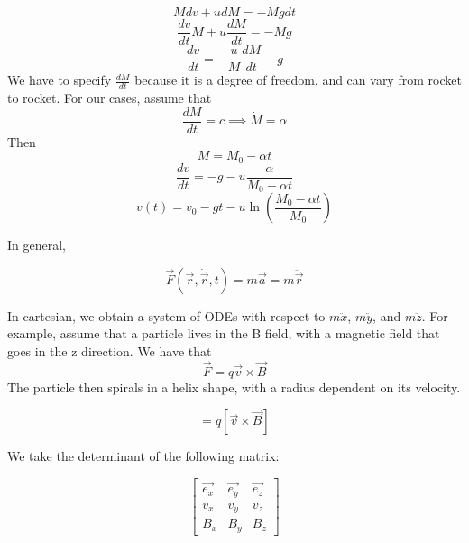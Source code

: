\documentclass{article}
\newtheorem{one minute paper}[theorem]{One Minute Paper}
\begin{document}
\begin{equation}
    Mdv + udM = -Mgdt
\end{equation}
\begin{equation}
    \frac{dv}{dt}M +  u \frac{dM}{dt} = -Mg
\end{equation}
\begin{equation}
    \frac{dv}{dt} = -\frac{u}{M}\frac{dM}{dt} - g
\end{equation}
We have to specify $\frac{dM}{dt}$ because it is a degree of freedom, and can vary from rocket to rocket. For our cases, assume that
\begin{equation}
    \frac{dM}{dt} = c \implies \dot{M} = \alpha
\end{equation}
Then 
\begin{equation}
    M = M_0 - \alpha t
\end{equation}
\begin{equation}
    \frac{dv}{dt} = -g - u\frac{\alpha}{M_0 - \alpha t}
\end{equation}
\begin{equation}
    v(t) = v_0 - gt - u\ln\left(\frac{M_0 - \alpha t}{M_0}\right)
\end{equation}

\newpage 

In general,

\begin{equation}
    \vec{F}(\vec{r}, \dot{\vec{r}}, t) = m\vec{a} = m \ddot{\vec{r}}
\end{equation}

In cartesian, we obtain a system of ODEs with respect to $m\ddot{x}$, $m\ddot{y}$, and $m\ddot{z}$. For example, assume 
that a particle lives in the B field, with a magnetic field that goes in the z direction. We have that 
\begin{equation}
    \vec{F} = q\vec{v} \times \vec{B}
\end{equation}
The particle then spirals in a helix shape, with a radius dependent on its velocity. 

\begin{equation}
    = q\left[\vec{v} \times \vec{B}\right]
\end{equation}

We take the determinant of the following matrix:

\[\left[\begin{array}{ccc}
    \vec{e_x} & \vec{e_y} & \vec{e_z} \\
    v_x & v_y & v_z \\
    B_x & B_y & B_z
\end{array}\right]\]
\end{document}

